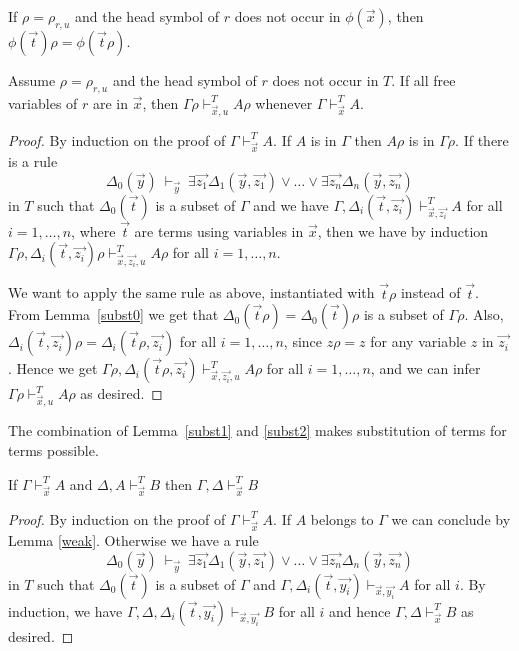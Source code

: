\documentclass[10pt,a4paper]{article}
\begin{document}
\begin{lemma}\label{subst0}
If $\rho = \rho_{r,u}$ and the head symbol of $r$ does not occur in 
$\phi(\vec{x})$, then $\phi(\vec{t})\rho =\phi(\vec{t}\rho)$.
\end{lemma}

\begin{lemma}\label{subst2}
Assume $\rho = \rho_{r,u}$ and the head symbol of $r$ does not occur in $T$.
If all free variables of $r$ are in $\vec{x}$, then $\Gamma\rho\vdash_{\vec{x},u}^T A\rho$
whenever $\Gamma\vdash_{\vec{x}}^T A$.
\end{lemma}

\begin{proof}
By induction on the proof of $\Gamma\vdash_{\vec{x}}^T A$.
If $A$ is in $\Gamma$ then $A\rho$ is in $\Gamma\rho$.
If there is a rule
$$
\Delta_0(\vec{y})~\vdash_{\vec{y}}~
\exists \vec{z_1}\Delta_1(\vec{y},\vec{z_1})\vee\dots\vee\exists \vec{z_n}\Delta_n(\vec{y},\vec{z_n})
$$
in $T$ such that $\Delta_0(\vec{t})$ is a subset of $\Gamma$ and
we have $\Gamma,\Delta_i(\vec{t},\vec{z_i})\vdash^T_{\vec{x},\vec{z_i}} A$ for all $i = 1,\dots,n$,
where $\vec{t}$ are terms using variables in $\vec{x}$, then we have by induction
$\Gamma\rho,\Delta_i(\vec{t},\vec{z_i})\rho\vdash^T_{\vec{x},\vec{z_i},u} A\rho$
for all $i = 1,\dots,n$. 

We want to apply the same rule as above, instantiated
with $\vec{t}\rho$ instead of $\vec{t}$. From Lemma~\ref{subst0} we get that
$\Delta_0(\vec{t}\rho) = \Delta_0(\vec{t})\rho$ is a subset of $\Gamma\rho$.
Also, $\Delta_i(\vec{t},\vec{z_i})\rho = \Delta_i(\vec{t}\rho,\vec{z_i})$ 
for all $i = 1,\dots,n$, since $z\rho = z$ for any variable $z$ in $\vec{z_i}$.
Hence we get
$\Gamma\rho,\Delta_i(\vec{t}\rho,\vec{z_i})\vdash^T_{\vec{x},\vec{z_i},u} A\rho$ for all $i = 1,\dots,n$,
and we can infer $\Gamma\rho\vdash^T_{\vec{x},u} A\rho$ as desired.
\end{proof}

The combination of Lemma~\ref{subst1} and \ref{subst2} makes
substitution of terms for terms possible.

\begin{lemma}\label{cut}
If $\Gamma\vdash_{\vec{x}}^T A$ and $\Delta,A\vdash_{\vec{x}}^T B$ then
$\Gamma,\Delta\vdash_{\vec{x}}^T B$
\end{lemma}

\begin{proof}
By induction on the proof of $\Gamma\vdash_{\vec{x}}^T A$. If $A$ belongs to $\Gamma$ we can
conclude by Lemma \ref{weak}. 
Otherwise we have a rule
$$
\Delta_0(\vec{y})~\vdash_{\vec{y}}~
\exists \vec{z_1}\Delta_1(\vec{y},\vec{z_1})\vee\dots\vee\exists \vec{z_n}\Delta_n(\vec{y},\vec{z_n})
$$
in $T$ such that $\Delta_0(\vec{t})$ is a subset of $\Gamma$ and
$\Gamma,\Delta_i(\vec{t},\vec{y_i})\vdash_{\vec{x},\vec{y_i}} A$ for all $i$.
By induction, we have $\Gamma,\Delta,\Delta_i(\vec{t},\vec{y_i})\vdash_{\vec{x},\vec{y_i}} B$ for all $i$
and hence $\Gamma,\Delta\vdash_{\vec{x}}^T B$ as desired.
\end{proof}
\end{document}
